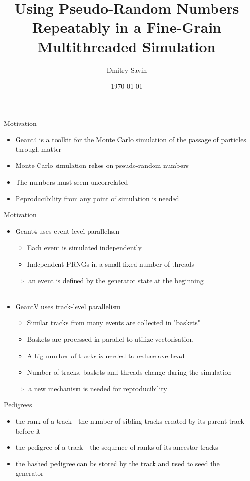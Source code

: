 \documentclass[aspectratio=169, 14pt]{beamer}
\title{Using Pseudo-Random Numbers Repeatably in a Fine-Grain Multithreaded Simulation}
\author{Dmitry Savin}
\date{\today}
\begin{document}
\begin{large}

 \frame{\titlepage}


 \begin{frame}{Motivation}
 \large
  \begin{itemize}
   \item Geant4 is a toolkit for the Monte Carlo simulation of the passage of particles through matter
   \item Monte Carlo simulation relies on pseudo-random numbers
   \item The numbers must seem uncorrelated
   \item Reproducibility from any point of simulation is needed
  \end{itemize}
 \end{frame}
 
  \begin{frame}{Motivation}
  \large
  \begin{itemize}
   \item Geant4 uses event-level parallelism
   \begin{itemize}
     \item Each event is simulated independently
     \item Independent PRNGs in a small fixed number of threads
    \end{itemize}
    $\Rightarrow$ an event is defined by the generator state at the beginning\\ \ \\
   \item GeantV uses track-level parallelism
    \begin{itemize}
     \item Similar tracks from many events are collected in "baskets"
     \item Baskets are processed in parallel to utilize vectorisation
     \item A big number of tracks is needed to reduce overhead
     \item Number of tracks, baskets and threads change during the simulation
    \end{itemize}
   $\Rightarrow$ a new mechanism is needed for reproducibility
  \end{itemize}

 \end{frame}

 
 \begin{frame}{Pedigrees}
  \begin{itemize}
   \item the rank of a track - the number of sibling tracks created by its parent track before it
   \item the pedigree of a track - the sequence of ranks of its ancestor tracks
   \item the hashed pedigree can be stored by the track and used to seed the generator
  \end{itemize}
 \end{frame}



\end{large}
\end{document}
